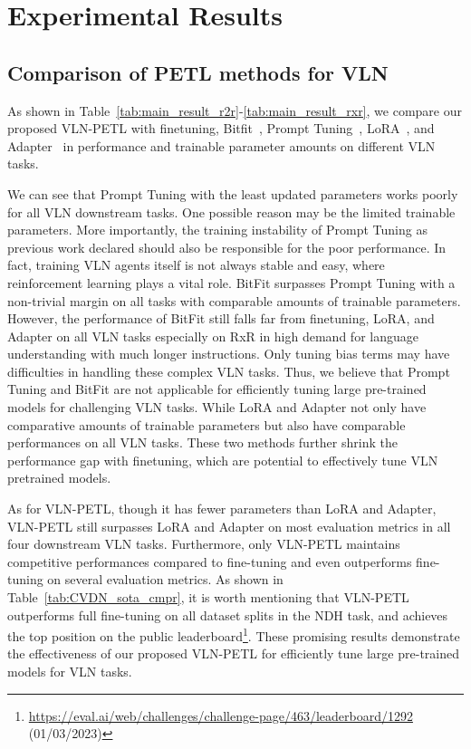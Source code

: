 \documentclass[10pt,twocolumn,letterpaper]{article}
\begin{document}
\section{Experimental Results}
\label{sec:results}

\subsection{Comparison of PETL methods for VLN}
As shown in Table~\ref{tab:main_result_r2r}-\ref{tab:main_result_rxr}, we compare our proposed VLN-PETL with finetuning, Bitfit~\cite{BenZaken2022BitFitSP}, Prompt Tuning~\cite{lester-etal-2021-power}, LoRA~\cite{hu2021lora}, and Adapter~\cite{houlsby2019adapter} in performance and trainable parameter amounts on different VLN tasks.

We can see that Prompt Tuning with the least updated parameters works poorly for all VLN downstream tasks. One possible reason may be the limited trainable parameters. More importantly, the training instability of Prompt Tuning as previous work declared should also be responsible for the poor performance. In fact, training VLN agents itself is not always stable and easy, where reinforcement learning plays a vital role. BitFit surpasses Prompt Tuning with a non-trivial margin on all tasks with comparable amounts of trainable parameters. However, the performance of BitFit still falls far from finetuning, LoRA, and Adapter on all VLN tasks especially on RxR in high demand for language understanding with much longer instructions. Only tuning bias terms may have difficulties in handling these complex VLN tasks. Thus, we believe that Prompt Tuning and BitFit are not applicable for efficiently tuning large pre-trained models for challenging VLN tasks. 
While LoRA and Adapter not only have comparative amounts of trainable parameters but also have comparable performances on all VLN tasks. These two methods further shrink the performance gap with finetuning, which are potential to effectively tune VLN pretrained models.

As for VLN-PETL, though it has fewer parameters than LoRA and Adapter, VLN-PETL still surpasses LoRA and Adapter on most evaluation metrics in all four downstream VLN tasks. Furthermore, only VLN-PETL maintains competitive performances compared to fine-tuning and even outperforms fine-tuning on several evaluation metrics. As shown in Table~\ref{tab:CVDN_sota_cmpr}, it is worth mentioning that VLN-PETL outperforms full fine-tuning on all dataset splits in the NDH task, and achieves the top position on the public leaderboard\footnote{\url{https://eval.ai/web/challenges/challenge-page/463/leaderboard/1292} (01/03/2023)}. These promising results demonstrate the effectiveness of our proposed VLN-PETL for efficiently tune large pre-trained models for VLN tasks.
\end{document}
